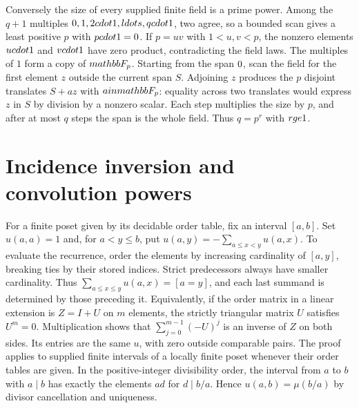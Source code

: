 Conversely the size of every supplied finite field is a prime power. Among
the $q+1$ multiples $0,1,2\\cdot1,\\ldots,q\\cdot1$, two agree, so a
bounded scan gives a least positive $p$ with $p\\cdot1=0$. If $p=uv$
with $1<u,v<p$, the nonzero elements $u\\cdot1$ and $v\\cdot1$ have zero
product, contradicting the field laws. The multiples of $1$ form a copy
of $\\mathbb F_p$. Starting from the span $\\{0\\}$, scan the field for the
first element $z$ outside the current span $S$. Adjoining $z$ produces
the $p$ disjoint translates $S+az$ with $a\\in\\mathbb F_p$: equality
across two translates would express $z$ in $S$ by division by a nonzero
scalar. Each step multiplies the size by $p$, and after at most $q$ steps
the span is the whole field. Thus $q=p^r$ with $r\\ge1$.

\section{Incidence inversion and convolution powers}
\label{sec:incidence}
For a finite poset given by its decidable order table, fix an interval
$[a,b]$. Set $u(a,a)=1$ and, for $a<y\le b$, put
$u(a,y)=-\sum_{a\le x<y}u(a,x)$. To evaluate the recurrence,
order the elements by increasing cardinality of $[a,y]$, breaking ties
by their stored indices. Strict predecessors always have smaller
cardinality. Thus $\sum_{a\le x\le y}u(a,x)=[a=y]$, and each last
summand is determined by those preceding it. Equivalently, if the
order matrix in a linear extension is $Z=I+U$ on $m$ elements, the
strictly triangular matrix $U$ satisfies $U^m=0$. Multiplication shows
that $\sum_{j=0}^{m-1}(-U)^j$ is an inverse of $Z$ on both sides.
Its entries are the same $u$, with zero outside
comparable pairs. The proof applies to supplied finite intervals of a
locally finite poset whenever their order tables are given.
In the positive-integer divisibility order, the interval from $a$ to
$b$ with $a\mid b$ has exactly the elements $ad$ for $d\mid b/a$.
Hence $u(a,b)=\mu(b/a)$ by divisor cancellation and uniqueness.


